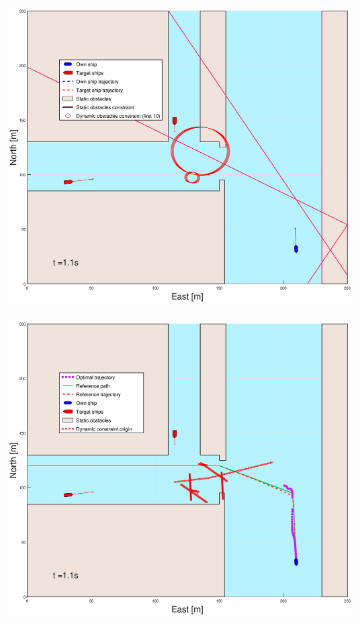\begin{figure}[!ht]
\begin{subfigure}[b]{0.499\textwidth}
    \end{subfigure}
    \hfill
    \\
    \begin{subfigure}[b]{0.49\textwidth}
        \centering
        \includegraphics[width=\textwidth]{Images/Figures/Havn1/_Simple_0fig1_time=1}
    \end{subfigure}
    \hfill
    \begin{subfigure}[b]{0.499\textwidth}
        \centering
        \includegraphics[width=\textwidth]{Images/Figures/Havn1/_Simple_0fig999_time=1}

\end{subfigure}
\end{figure}
